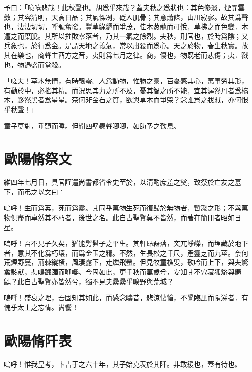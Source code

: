 予曰：「噫嘻悲哉！此秋聲也。胡爲{乎}來哉？蓋夫秋之爲狀也：其色慘淡，煙霏雲斂；其容清明，天高日晶；其氣慄冽，砭人肌骨；其意蕭條，山川寂寥。故其爲聲也，淒淒切切，呼號奮發。豐草綠縟而爭茂，佳木葱蘢而可悅，草拂之而色變，木遭之而葉脫。其所以摧敗零落者，乃其一氣之餘烈。夫秋，刑官也，於時爲陰；又兵象也，於行爲金。是謂天地之義氣，常以肅殺而爲心。天之於物，春生秋實。故其在樂也，商聲主西方之音，夷則爲七月之律。商，傷也，物既老而悲傷；夷，戮也，物過盛而當殺。%

「嗟夫！草木無情，有時飄零。人爲動物，惟物之靈，百憂感其心，萬事勞其形，有動於中，必搖其精。而況思其力之所不及，憂其智之所不能，宜其渥然丹者爲槁木，黟然黑者爲星星。奈何非金石之質，欲與草木而爭榮？念誰爲之戕賊，亦何恨乎秋聲！」

童子莫對，垂頭而睡。但聞四壁蟲聲唧唧，如助予之歎息。

\theendnotes

\section[祭石曼卿文\quad{\small 歐陽脩}]{{\normalsize 歐陽脩}\quad 祭文}
維四年七月日，具官謹遣尚書都省令史至於，以清酌庶羞之奠，致祭於亡友之墓下，而弔之以文曰：

嗚呼！生而爲英，死而爲靈。其同乎萬物生死而復歸於無物者，暫聚之形；不與萬物俱盡而卓然其不朽者，後世之名。此自古聖賢莫不皆然，而著在簡冊者昭如日星。

嗚呼！吾不見子久矣，猶能髣髴子之平生。其軒昂磊落，突兀崢嶸，而埋藏於地下者，意其不化爲朽壤，而爲金玉之精。不然，生長松之千尺，產靈芝而九莖。奈何荒煙野蔓，荊棘縱橫，風淒露下，走燐飛螢。但見牧童樵叟，歌吟而上下，與夫驚禽駭獸，悲鳴躑躅而咿嚶。今固如此，更千秋而萬歲兮，安知其不穴藏狐貉與鼯鼪？此自古聖賢亦皆然兮，獨不見夫纍纍乎曠野與荒城？

嗚呼！盛衰之理，吾固知其如此，而感念疇昔，悲涼悽愴，不覺臨風而隕涕者，有愧{乎}太上之忘情。尚饗！

\theendnotes 

\section[瀧岡阡表\quad{\small 歐陽脩}]{{\normalsize 歐陽脩}\quad {}阡表}
嗚呼！惟我皇考，卜吉于之六十年，其子始克表於其阡。非敢緩也，蓋有待也。


